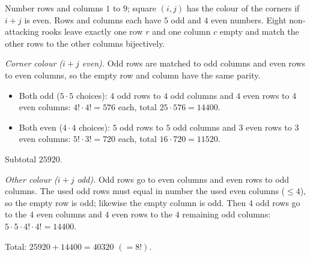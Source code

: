 Number rows and columns $1$ to $9$; square $(i,j)$ has the colour of the corners if $i+j$ is even. Rows and columns each have $5$ odd and $4$ even numbers. Eight non-attacking rooks leave exactly one row $r$ and one column $c$ empty and match the other rows to the other columns bijectively.

\emph{Corner colour ($i+j$ even).} Odd rows are matched to odd columns and even rows to even columns, so the empty row and column have the same parity.
\begin{itemize}
\item Both odd ($5\cdot5$ choices): $4$ odd rows to $4$ odd columns and $4$ even rows to $4$ even columns: $4!\cdot4!=576$ each, total $25\cdot576=14400$.
\item Both even ($4\cdot4$ choices): $5$ odd rows to $5$ odd columns and $3$ even rows to $3$ even columns: $5!\cdot3!=720$ each, total $16\cdot720=11520$.
\end{itemize}
Subtotal $25920$.

\emph{Other colour ($i+j$ odd).} Odd rows go to even columns and even rows to odd columns. The used odd rows must equal in number the used even columns ($\le4$), so the empty row is odd; likewise the empty column is odd. Then $4$ odd rows go to the $4$ even columns and $4$ even rows to the $4$ remaining odd columns: $5\cdot5\cdot4!\cdot4!=14400$.

Total: $25920+14400=\boxed{40320}$ $(=8!)$.
